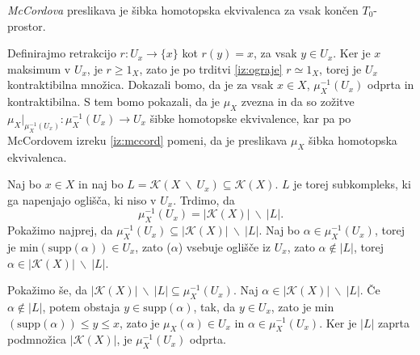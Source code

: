 \documentclass[mat1]{fmfdelo}
\begin{document}
\begin{izrek}
    \textit{McCordova} preslikava je šibka homotopska 
    ekvivalenca za vsak končen $T_0$-prostor.
    \label{iz:ksibka}
\end{izrek}

\begin{dokaz}
    Definirajmo retrakcijo $r\colon U_x\rightarrow \{x\}$ kot 
    $r(y)=x$, za vsak $y\in U_x$. Ker je $x$ maksimum v 
    $U_x$, je $r\geq 1_X$, zato je po trditvi 
    \ref{iz:ograje} $r\simeq 1_X$, torej je $U_x$ 
    kontraktibilna množica. Dokazali bomo, da je za vsak 
    $x\in X$, $\mu_X^{-1}(U_x)$ odprta in kontraktibilna. S 
    tem bomo pokazali, da je $\mu_X$ zvezna in da so 
    zožitve $\mu_X|_{\mu_X^{-1}(U_x)}\colon \mu_X^{-1}(U_x)\rightarrow 
    U_x$ šibke homotopske ekvivalence, kar pa po McCordovem izreku \ref{iz:mccord}
    pomeni, da je preslikava $\mu_X$ šibka homotopska ekvivalenca.

    Naj bo $x\in X$ in naj bo $L=\mathcal{K}(X\ \backslash \
    U_x)\subseteq \mathcal{K}(X)$. $L$ je torej 
    subkompleks, ki ga napenjajo oglišča, ki niso v $U_x$. 
    Trdimo, da 
    $$
    \mu_X^{-1}(U_x)=|\mathcal{K}(X)|\ \backslash \ |L|.
    $$
    Pokažimo najprej, da $\mu_X^{-1}(U_x)\subseteq 
    |\mathcal{K}(X)|\ \backslash \ |L|$. Naj bo $\alpha \in 
    \mu_X^{-1}(U_x)$, torej je min$(
    (\alpha))\in U_x$, zato \text{supp}($\alpha$) vsebuje 
    oglišče iz $U_x$, zato $\alpha \notin |L|$, torej $\alpha 
    \in |\mathcal{K}(X)|\ \backslash \ |L|$.

    Pokažimo še, da $|\mathcal{K}(X)|\ \backslash \
    |L|\subseteq \mu_X^{-1}(U_x)$. Naj $\alpha \in |\mathcal{K}(X)|\ \backslash \ |L|.$
    Če  $\alpha \notin |L|$, potem obstaja $y\in 
    \text{supp}(\alpha)$, tak, da $y \in U_x$, zato je 
    min$(\text{supp}(\alpha))\leq y \leq x$, zato je 
    $\mu_X(\alpha) \in U_x$ in $\alpha \in \mu_X^{-1}
    (U_x)$.
    Ker je $|L|$ zaprta podmnožica $|\mathcal{K}(X)|$, je 
    $\mu_X^{-1}(U_x)$ odprta.


\end{dokaz}
\end{document}
